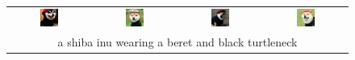 \begin{figure}[ht!]
    \centering 
    \vspace{-1.9cm}
    \setlength{\tabcolsep}{2.0pt}
    \begin{tabular}{cccc}
        \includegraphics[width=0.24\textwidth]{figures/cross/dog_0.jpg} &
        \includegraphics[width=0.24\textwidth]{figures/cross/dog_1.jpg} &
        \includegraphics[width=0.24\textwidth]{figures/cross/dog_2.jpg} &
        \includegraphics[width=0.24\textwidth]{figures/cross/dog_3.jpg} \vspace{-1mm}\\
        \multicolumn{4}{c}{\small a shiba inu wearing a beret and black turtleneck}\\
    

\end{tabular}
\end{figure}
